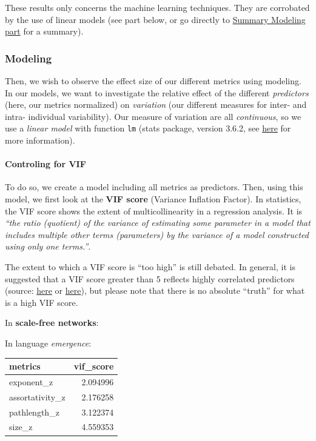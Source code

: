 \documentclass[
]{article}
\begin{document}
These results only concerns the machine learning techniques. They are
corrobated by the use of linear models (see part below, or go directly
to \protect\hyperlink{summary-modeling-part}{Summary Modeling part} for
a summary).

\hypertarget{modeling}{%
\subsubsection{Modeling}\label{modeling}}

Then, we wish to observe the effect size of our different metrics using
modeling. In our models, we want to investigate the relative effect of
the different \emph{predictors} (here, our metrics normalized) on
\emph{variation} (our different measures for inter- and intra-
individual variability). Our measure of variation are all
\emph{continuous}, so we use a \emph{linear model} with function
\texttt{lm} (stats package, version 3.6.2, see
\href{https://www.rdocumentation.org/packages/stats/versions/3.6.2/topics/lm}{here}
for more information).

\hypertarget{controling-for-vif}{%
\paragraph{Controling for VIF}\label{controling-for-vif}}

To do so, we create a model including all metrics as predictors. Then,
using this model, we first look at the \textbf{VIF score} (Variance
Inflation Factor). In statistics, the VIF score shows the extent of
multicollinearity in a regression analysis. It is \emph{``the ratio
(quotient) of the variance of estimating some parameter in a model that
includes multiple other terms (parameters) by the variance of a model
constructed using only one terms.''}.

The extent to which a VIF score is ``too high'' is still debated. In
general, it is suggested that a VIF score greater than 5 reflects highly
correlated predictors (source:
\href{https://www.statisticshowto.com/variance-inflation-factor/}{here}
or
\href{https://www.isixsigma.com/dictionary/variance-inflation-factor-vif/}{here}),
but please note that there is no absolute ``truth'' for what is a high
VIF score.

In \textbf{scale-free networks}:

In language \emph{emergence}:

\begin{longtable}[]{@{}lr@{}}
\toprule()
metrics & vif\_score \\
\midrule()
\endhead
exponent\_z & 2.094996 \\
assortativity\_z & 2.176258 \\
pathlength\_z & 3.122374 \\
size\_z & 4.559353 \\
\bottomrule()
\end{longtable}
\end{document}
